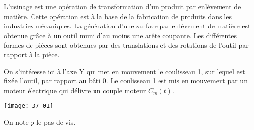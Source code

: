 \normaltrue \difficilefalse \tdifficilefalse
\correctionfalse


\setcounter{question}{0}%
\ifcorrection
\else
{}
\fi

\ifprof
\else
L’usinage est une opération de transformation d’un produit par enlèvement de matière.
Cette opération est à la base de la fabrication de produits dans les industries mécaniques.
La génération d’une surface par enlèvement de matière est obtenue grâce à un outil muni
d’au moins une arête coupante. Les différentes formes de pièces sont obtenues par des
translations et des rotations de l'outil par rapport à la pièce.


On s’intéresse ici à l’axe Y qui met en mouvement le coulisseau 1,
sur lequel est fixée l’outil, par rapport au bâti 0. Le coulisseau 1 est mis en mouvement par un moteur
électrique qui délivre un couple moteur $C_m(t)$.

\begin{marginfigure}
\texttt{[image: 37\_01]}
\end{marginfigure}

On note $p$ le pas de vis. 
\fi


\ifprof
\else
\fi

\ifprof ~\\
\else
\fi

\ifprof
\else


\fi